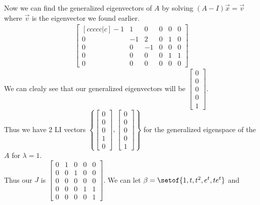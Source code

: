 \documentclass[answers,12pt,addpoints]{exam}
\begin{document}
\begin{questions}
\begin{solution}
        Now we can find the generalized eigenvectors of $A$ by solving $(A - I)\vec{x} = \vec{v}$ where $\vec{v}$ is the eigenvector we found earlier.
        \begin{align*}
            \begin{bmatrix}[ccccc|c]
                -1 & 1 & 0 & 0 & 0 & 0 \\
                0 & -1 & 2 & 0 & 1 & 0 \\
                0 & 0 & -1 & 0 & 0 & 0 \\
                0 & 0 & 0 & 0 & 1 & 1 \\
                0 & 0 & 0 & 0 & 0 & 0
            \end{bmatrix}
        \end{align*}
        We can clealy see that our generalized eigenvectors will be $\begin{bmatrix} 0 \\ 0 \\ 0 \\ 0 \\ 1 \end{bmatrix}$. \\
        Thus we have 2 LI vectors $\left\{ \begin{bmatrix} 0\\ 0\\ 0\\ 1\\ 0 \end{bmatrix}, \begin{bmatrix} 0\\ 0\\ 0\\ 0\\ 1 \end{bmatrix} \right\}$ for the generalized eigenspace of the $A$ for $\lambda = 1$. \\
        Thus our $J$ is $\begin{bmatrix}
            0 & 1 & 0 & 0 & 0 \\
            0 & 0 & 1 & 0 & 0 \\
            0 & 0 & 0 & 0 & 0 \\
            0 & 0 & 0 & 1 & 1 \\
            0 & 0 & 0 & 0 & 1
        \end{bmatrix}$.
        We can let $\beta = \setof{1, t, t^2, e^t, te^t}$ and\\

\end{solution}
\end{questions}
\end{document}
